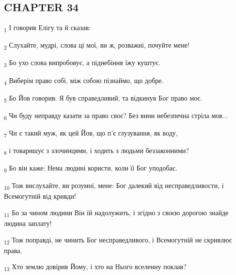 \subsection{CHAPTER 34}
\begin{tcolorbox}
\textsubscript{1} І говорив Елігу та й сказав:
\end{tcolorbox}
\begin{tcolorbox}
\textsubscript{2} Слухайте, мудрі, слова ці мої, ви ж, розважні, почуйте мене!
\end{tcolorbox}
\begin{tcolorbox}
\textsubscript{3} Бо ухо слова випробовує, а піднебіння їжу куштує.
\end{tcolorbox}
\begin{tcolorbox}
\textsubscript{4} Виберім право собі, між собою пізнаймо, що добре.
\end{tcolorbox}
\begin{tcolorbox}
\textsubscript{5} Бо Йов говорив: Я був справедливий, та відкинув Бог право моє.
\end{tcolorbox}
\begin{tcolorbox}
\textsubscript{6} Чи буду неправду казати за право своє? Без вини небезпечна стріла моя...
\end{tcolorbox}
\begin{tcolorbox}
\textsubscript{7} Чи є такий муж, як цей Йов, що п'є глузування, як воду,
\end{tcolorbox}
\begin{tcolorbox}
\textsubscript{8} і товаришує з злочинцями, і ходить з людьми беззаконними?
\end{tcolorbox}
\begin{tcolorbox}
\textsubscript{9} Бо він каже: Нема людині користи, коли її Бог уподобає.
\end{tcolorbox}
\begin{tcolorbox}
\textsubscript{10} Тож вислухайте, ви розумні, мене: Бог далекий від несправедливости, і Всемогутній від кривди!
\end{tcolorbox}
\begin{tcolorbox}
\textsubscript{11} Бо за чином людини Він їй надолужить, і згідно з своєю дорогою знайде людина заплату!
\end{tcolorbox}
\begin{tcolorbox}
\textsubscript{12} Тож поправді, не чинить Бог несправедливого, і Всемогутній не скривлює права.
\end{tcolorbox}
\begin{tcolorbox}
\textsubscript{13} Хто землю довірив Йому, і хто на Нього вселенну поклав?
\end{tcolorbox}
